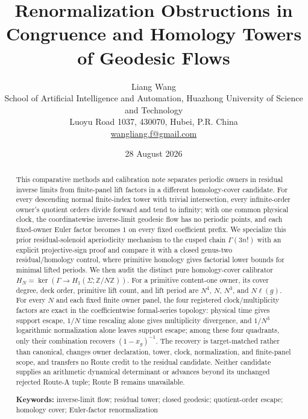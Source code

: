 \documentclass[11pt]{article}
\title{Renormalization Obstructions in Congruence and Homology Towers of Geodesic Flows}
\author{Liang Wang\\[2pt]
\small School of Artificial Intelligence and Automation, Huazhong University of Science and Technology\\
\small Luoyu Road 1037, 430070, Hubei, P.R. China\\
\small \href{mailto:wangliang.f@gmail.com}{wangliang.f@gmail.com}}
\date{28 August 2026}
\theoremstyle{definition}
\theoremstyle{remark}
\begin{document}
\maketitle

\begin{abstract}
This comparative methods and calibration note separates periodic owners in residual inverse limits from finite-panel lift factors in a different homology-cover candidate. For every descending normal finite-index tower with trivial intersection, every infinite-order owner's quotient orders divide forward and tend to infinity; with one common physical clock, the coordinatewise inverse-limit geodesic flow has no periodic points, and each fixed-owner Euler factor becomes $1$ on every fixed coefficient prefix. We specialize this prior residual-solenoid aperiodicity mechanism to the cusped chain $\Gamma(3n!)$ with an explicit projective-sign proof and compare it with a closed genus-two residual/homology control, where primitive homology gives factorial lower bounds for minimal lifted periods. We then audit the distinct pure homology-cover calibrator $H_N=\ker(\Gamma\to H_1(\Sigma;\mathbb Z/N\mathbb Z))$. For a primitive content-one owner, its cover degree, deck order, primitive lift count, and lift period are $N^4$, $N$, $N^3$, and $N\ell(g)$. For every $N$ and each fixed finite owner panel, the four registered clock/multiplicity factors are exact in the coefficientwise formal-series topology: physical time gives support escape, $1/N$ time rescaling alone gives multiplicity divergence, and $1/N^3$ logarithmic normalization alone leaves support escape; among these four quadrants, only their combination recovers $(1-x_g)^{-1}$. The recovery is target-matched rather than canonical, changes owner declaration, tower, clock, normalization, and finite-panel scope, and transfers no Route credit to the residual candidate. Neither candidate supplies an arithmetic dynamical determinant or advances beyond its unchanged rejected Route-A tuple; Route B remains unavailable.

\medskip
\noindent\textbf{Keywords:} inverse-limit flow; residual tower; closed geodesic; quotient-order escape; homology cover; Euler-factor renormalization
\end{abstract}
\end{document}
